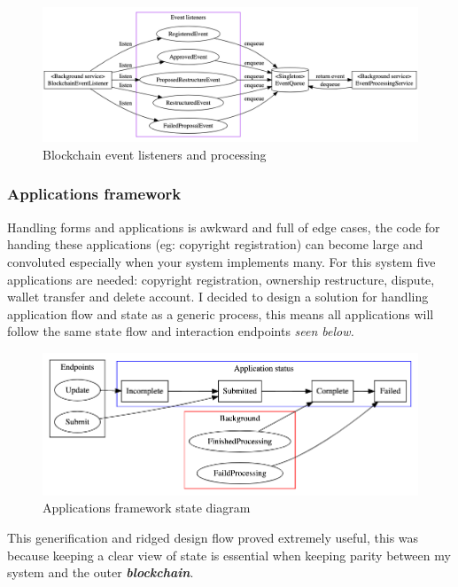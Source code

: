 \documentclass[12pt]{article}
\newcommand{\keyword}[1]{\textbf{\textit{#1}}}
\begin{document}
\begin{figure}[H]
\caption{Blockchain event listeners and processing}
\centering
\includegraphics[width=\textwidth,height=0.5\textheight,keepaspectratio]{images/operational/Event-Listening}
\end{figure}

\subsubsection{Applications framework}

Handling forms and applications is awkward and full of edge cases, the code for handing these applications (eg: copyright registration) can become large and convoluted especially when your system implements many. For this system five applications are needed: copyright registration, ownership restructure, dispute, wallet transfer and delete account. I decided to design a solution for handling application flow and state as a generic process, this means all applications will follow the same state flow and interaction endpoints \textit{seen below.} 

\begin{figure}[H]
\caption{Applications framework state diagram}
\centering
\includegraphics[width=\textwidth,height=0.5\textheight,keepaspectratio]{images/operational/applications-status}
\end{figure}

This generification and ridged design flow proved extremely useful, this was because keeping a clear view of state is essential when keeping parity between my system and the outer \keyword{blockchain}.
\end{document}
